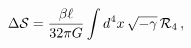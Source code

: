 \begin{equation}
\Delta {\cal{S}}=\frac{\beta \ell}{32\pi G}\int d^4x\,\sqrt{-\gamma}\,
{\cal R}_4\,,
\end{equation} 

